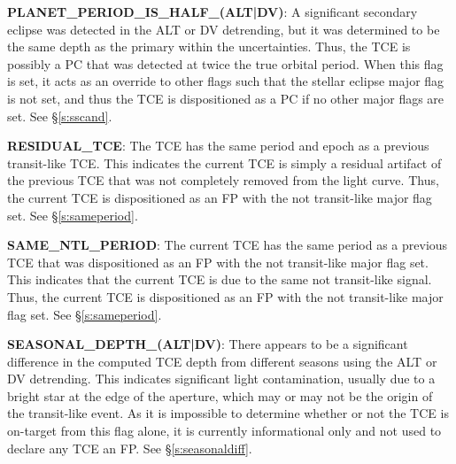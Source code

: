 
\textbf{PLANET\_PERIOD\_IS\_HALF\_(ALT|DV)}: A significant secondary eclipse was detected in the ALT or DV detrending, but it was determined to be the same depth as the primary within the uncertainties. Thus, the TCE is possibly a PC that was detected at twice the true orbital period. When this flag is set, it acts as an override to other flags such that the stellar eclipse major flag is not set, and thus the TCE is dispositioned as a PC if no other major flags are set. See \S\ref{s:sscand}.


\textbf{RESIDUAL\_TCE}: The TCE has the same period and epoch as a previous transit-like TCE. This indicates the current TCE is simply a residual artifact of the previous TCE that was not completely removed from the light curve. Thus, the current TCE is dispositioned as an FP with the not transit-like major flag set. See \S\ref{s:sameperiod}.

\textbf{SAME\_NTL\_PERIOD}: The current TCE has the same period as a previous TCE that was dispositioned as an FP with the not transit-like major flag set. This indicates that the current TCE is due to the same not transit-like signal. Thus, the current TCE is dispositioned as an FP with the not transit-like major flag set. See \S\ref{s:sameperiod}.

\textbf{SEASONAL\_DEPTH\_(ALT|DV)}: There appears to be a significant difference in the computed TCE depth from different seasons using the ALT or DV detrending. This indicates significant light contamination, usually due to a bright star at the edge of the aperture, which may or may not be the origin of the transit-like event. As it is impossible to determine whether or not the TCE is on-target from this flag alone, it is currently informational only and not used to declare any TCE an FP. See \S\ref{s:seasonaldiff}.

